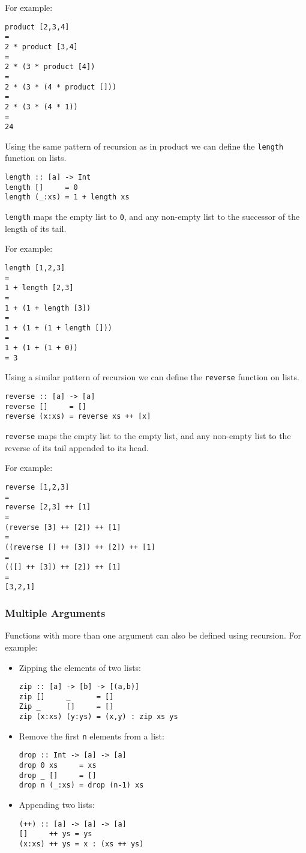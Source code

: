 \begin{multicols}{2}
For example:
\begin{lstlisting}
product [2,3,4]
=
2 * product [3,4]
=
2 * (3 * product [4])
=
2 * (3 * (4 * product []))
=
2 * (3 * (4 * 1))
=
24
\end{lstlisting}

Using the same pattern of recursion as in product we can define the \lstinline{length} function on lists.
\begin{lstlisting}
length :: [a] -> Int
length []     = 0
length (_:xs) = 1 + length xs
\end{lstlisting}
\lstinline{length} maps the empty list to \lstinline{0}, and any non-empty list to the successor of the length of its tail.

For example:
\begin{lstlisting}
length [1,2,3]
=
1 + length [2,3]
=
1 + (1 + length [3])
=
1 + (1 + (1 + length []))
=
1 + (1 + (1 + 0))
= 3
\end{lstlisting}

Using a similar pattern of recursion we can define the \lstinline{reverse} function on lists.
\begin{lstlisting}
reverse :: [a] -> [a]
reverse []     = []
reverse (x:xs) = reverse xs ++ [x]
\end{lstlisting}
\lstinline{reverse} maps the empty list to the empty list, and any non-empty list to the reverse of its tail appended to its head.

For example:
\begin{lstlisting}
reverse [1,2,3]
=
reverse [2,3] ++ [1]
=
(reverse [3] ++ [2]) ++ [1]
=
((reverse [] ++ [3]) ++ [2]) ++ [1]
=
(([] ++ [3]) ++ [2]) ++ [1]
=
[3,2,1]
\end{lstlisting}

\subsubsection{Multiple Arguments}
Functions with more than one argument can also be defined using recursion.
For example:
\begin{itemize}
  \item Zipping the elements of two lists:
\begin{lstlisting}
zip :: [a] -> [b] -> [(a,b)]
zip []     _      = []
Zip _      []     = []
zip (x:xs) (y:ys) = (x,y) : zip xs ys
\end{lstlisting}
  \item Remove the first \lstinline{n} elements from a list:
\begin{lstlisting}
drop :: Int -> [a] -> [a]
drop 0 xs     = xs
drop _ []     = []
drop n (_:xs) = drop (n-1) xs
\end{lstlisting}
  \item Appending two lists:
\begin{lstlisting}
(++) :: [a] -> [a] -> [a]
[]     ++ ys = ys
(x:xs) ++ ys = x : (xs ++ ys)
\end{lstlisting}
\end{itemize}


\end{multicols}
